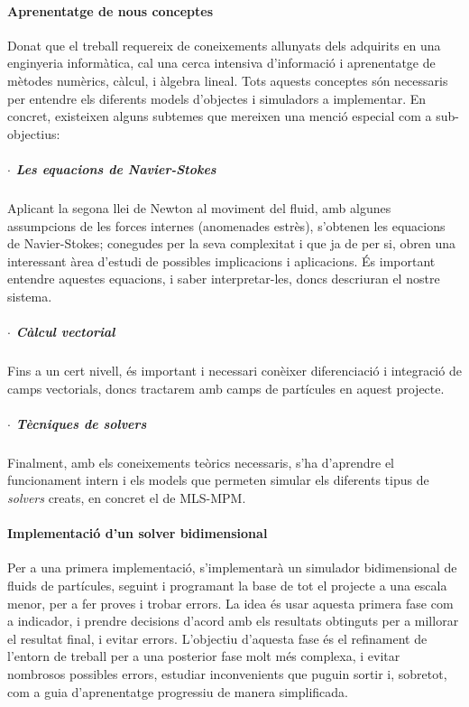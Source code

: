 \documentclass[a4paper]{report}
\begin{document}
	\paragraph{Aprenentatge de nous conceptes} Donat que el treball requereix de coneixements allunyats dels adquirits en una enginyeria informàtica, cal una cerca intensiva d'informació i aprenentatge de mètodes numèrics, càlcul, i àlgebra lineal. Tots aquests conceptes són necessaris per entendre els diferents models d'objectes i simuladors a implementar. \newline
	En concret, existeixen alguns subtemes que mereixen una menció especial com a sub-objectius:
	\subparagraph[Navier-Stokes]{$\cdot$ Les equacions de Navier-Stokes} Aplicant la segona llei de Newton al moviment del fluid, amb algunes assumpcions de les forces internes (anomenades estrès), s'obtenen les equacions de Navier-Stokes; conegudes per la seva complexitat i que ja de per si, obren una interessant àrea d'estudi de possibles implicacions i aplicacions.
	\newline
	És important entendre aquestes equacions, i saber interpretar-les, doncs descriuran el nostre sistema.
	\subparagraph[Càlcul vectorial]{$\cdot$ Càlcul vectorial} Fins a un cert nivell, és important i necessari conèixer diferenciació i integració de camps vectorials, doncs tractarem amb camps de partícules en aquest projecte.
	\subparagraph[Tècniques de solvers]{$\cdot$ Tècniques de solvers} Finalment, amb els coneixements teòrics necessaris, s'ha d'aprendre el funcionament intern i els models que permeten simular els diferents tipus de \textit{solvers} creats, en concret el de MLS-MPM\cite{hu2018mlsmpmcpic}.
	
	\paragraph{Implementació d'un solver bidimensional} Per a una primera implementació, s'implementarà un simulador bidimensional de fluids de partícules, seguint\cite{Hu,hu2018mlsmpmcpic} i programant la base de tot el projecte a una escala menor, per a fer proves i trobar errors. La idea és usar aquesta primera fase com a indicador, i prendre decisions d'acord amb els resultats obtinguts per a millorar el resultat final, i evitar errors. \newline
	L'objectiu d'aquesta fase és el refinament de l'entorn de treball per a una posterior fase molt més complexa, i evitar nombrosos possibles errors, estudiar inconvenients que puguin sortir i, sobretot, com a guia d'aprenentatge progressiu de manera simplificada. 
	
\end{document}
